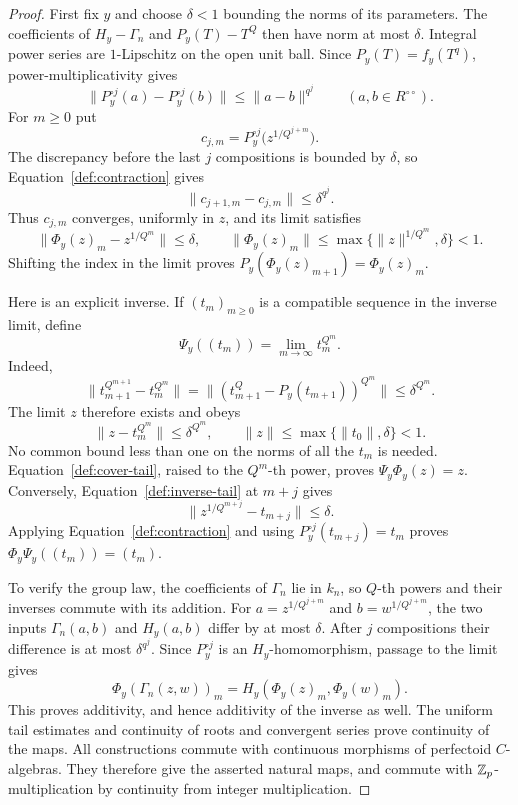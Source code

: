 \begin{proof}
First fix $y$ and choose $\delta<1$ bounding the norms of its parameters.
The coefficients of $H_y-\Gamma_n$ and $P_y(T)-T^Q$ then have norm at most
$\delta$.  Integral power series are $1$-Lipschitz on the open unit ball.
Since $P_y(T)=f_y(T^q)$, power-multiplicativity gives
\begin{equation}
 \|P_y^{\circ j}(a)-P_y^{\circ j}(b)\|
       \le \|a-b\|^{q^j}
       \qquad(a,b\in R^{\circ\circ}).
 \label{def:contraction}
\end{equation}
For $m\ge0$ put
\[
 c_{j,m}=P_y^{\circ j}\bigl(z^{1/Q^{j+m}}\bigr).
\]
The discrepancy before the last $j$ compositions is bounded by $\delta$,
so Equation~\eqref{def:contraction} gives
\[
 \|c_{j+1,m}-c_{j,m}\|\le\delta^{q^j}.
\]
Thus $c_{j,m}$ converges, uniformly in $z$, and its limit satisfies
\begin{equation}
 \|\Phi_y(z)_m-z^{1/Q^m}\|\le\delta,
 \qquad
 \|\Phi_y(z)_m\|
       \le\max\{\|z\|^{1/Q^m},\delta\}<1.
 \label{def:cover-tail}
\end{equation}
Shifting the index in the limit proves
$P_y(\Phi_y(z)_{m+1})=\Phi_y(z)_m$.

Here is an explicit inverse.  If $(t_m)_{m\ge0}$ is a compatible sequence
in the inverse limit, define
\[
 \Psi_y((t_m))=\lim_{m\to\infty}t_m^{Q^m}.
\]
Indeed,
\[
 \|t_{m+1}^{Q^{m+1}}-t_m^{Q^m}\|
   =\|(t_{m+1}^Q-P_y(t_{m+1}))^{Q^m}\|
   \le\delta^{Q^m}.
\]
The limit $z$ therefore exists and obeys
\begin{equation}
 \|z-t_m^{Q^m}\|\le\delta^{Q^m},
 \qquad \|z\|\le\max\{\|t_0\|,\delta\}<1.
 \label{def:inverse-tail}
\end{equation}
No common bound less than one on the norms of all the $t_m$ is needed.
Equation~\eqref{def:cover-tail}, raised to the $Q^m$-th power, proves
$\Psi_y\Phi_y(z)=z$.  Conversely, Equation~\eqref{def:inverse-tail} at
$m+j$ gives
\[
 \|z^{1/Q^{m+j}}-t_{m+j}\|\le\delta.
\]
Applying Equation~\eqref{def:contraction} and using
$P_y^{\circ j}(t_{m+j})=t_m$ proves
$\Phi_y\Psi_y((t_m))=(t_m)$.

To verify the group law, the coefficients of $\Gamma_n$ lie in $k_n$, so
$Q$-th powers and their inverses commute with its addition.  For
$a=z^{1/Q^{j+m}}$ and $b=w^{1/Q^{j+m}}$, the two inputs
$\Gamma_n(a,b)$ and $H_y(a,b)$ differ by at most $\delta$.
After $j$ compositions their difference is at most $\delta^{q^j}$.
Since $P_y^{\circ j}$ is an $H_y$-homomorphism, passage to the limit gives
\[
 \Phi_y(\Gamma_n(z,w))_m
     =H_y(\Phi_y(z)_m,\Phi_y(w)_m).
\]
This proves additivity, and hence additivity of the inverse as well.
The uniform tail estimates and continuity of roots and convergent series
prove continuity of the maps.  All constructions commute with continuous
morphisms of perfectoid $C$-algebras.  They therefore give the asserted
natural maps, and commute with $\mathbb Z_p$-multiplication by continuity from
integer multiplication.


\end{proof}
